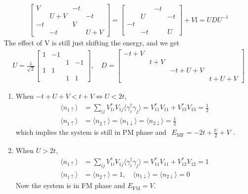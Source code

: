 \documentclass[../../main.tex]{subfiles}
\begin{document}
\begin{enumerate}
{{  \begin{align*}
    \begin{bmatrix}
       V &    & -t &   \\
         & U + V&  & -t\\
      -t &    &  V &   \\
         & -t &    & U + V
    \end{bmatrix} = \begin{bmatrix}
        &    & -t &   \\
        & U  &    & -t\\
     -t &    &    &   \\
        & -t &    & U 
   \end{bmatrix} + V\mathbb{I} = UDU^{-1}
  \end{align*}
  The effect of V is still just shifting the energy, and we get
  \begin{align*}
    U = \frac{1}{\sqrt{2}}\begin{bmatrix}
   1  &-1 &   &   \\
      &   & 1 &-1 \\
   1  & 1 &   &   \\
      &   & 1 & 1 
  \end{bmatrix},\quad D = \begin{bmatrix}
    -t + V  &  &   & \\
     & t + V &  &  \\
      &  & -t + U + V &  \\
     &   &  & t + U + V
  \end{bmatrix}
  \end{align*}
  \begin{enumerate}
    \item When $ -t + U + V < t + V\iff U < 2t$, 
    \begin{align*}
      \langle n_{1\uparrow}\rangle &= \sum_{ij}V_{1i}^{*}V_{1j}\langle\gamma_{i}^{\dagger}\gamma_{j}\rangle = V_{11}^{*}V_{11} + V_{13}^{*}V_{13} = \frac{1}{2}\\
      \langle n_{1\uparrow}\rangle &= \langle n_{2\uparrow}\rangle = \langle n_{1\downarrow}\rangle = \langle n_{2\downarrow}\rangle = \frac{1}{2}
    \end{align*}
    which implies the system is still in PM phase and $\begin{aligned}
      E_{\text{MF}} = -2t + \frac{U}{2} + V
    \end{aligned}$.
    \item When $U > 2t$, 
    \begin{align*}
      \langle n_{1\uparrow}\rangle &= \sum_{ij}V_{1i}^{*}V_{1j}\langle\gamma_{i}^{\dagger}\gamma_{j}\rangle = V_{11}^{*}V_{11} + V_{12}^{*}V_{12} = 1\\
      \langle n_{1\uparrow}\rangle &= \langle n_{2\uparrow}\rangle = 1,\quad \langle n_{1\downarrow}\rangle = \langle n_{2\downarrow}\rangle = 0
    \end{align*}
    Now the system is in FM phase and $E_{\text{FM}} = V$.
  \end{enumerate}}}


\end{enumerate}
\end{document}
